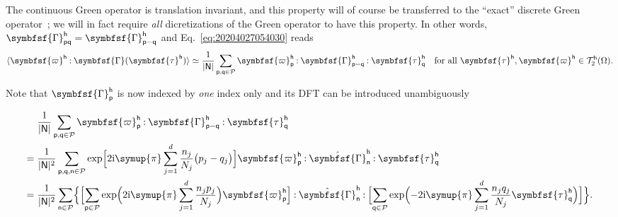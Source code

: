 \documentclass[draft, appendixprefix=true, chapterprefix=true, fontsize=12pt, numbers=noendperiod]{scrbook}
\newcommand{\cellindices}{\mathcal P}
\newcommand{\dbldot}{\mathbin{\mathord{:}}}
\newcommand{\I}{\mathrm{i}}
\newcommand{\tens}[1]{\symbfsf{#1}}
\newcommand{\PI}{\symup{\pi}}
\newcommand{\tensors}{\mathcal T}
\newcommand{\tuple}[1]{\mathsf{#1}}
\begin{document}
The continuous Green operator is translation invariant, and this property will
of course be transferred to the ``exact'' discrete Green operator~; we will in
fact require \emph{all} dicretizations of the Green operator to have this
property. In other words,
\(\tens\Gamma_{\tuple{p}\tuple{q}}^{\tuple{h}}=\tens\Gamma_{\tuple p-\tuple q}^{\tuple{h}}\)
and Eq.~\eqref{eq:20204027054030} reads
\begin{equation}
  \langle\tens\varpi^{\tuple{h}}\dbldot\tens\Gamma(\tens\tau^{\tuple{h}})\rangle
  \simeq\frac1{\lvert\tuple{N}\rvert}\sum_{\tuple{p}, \tuple{q}\in\cellindices}
  \tens\varpi_{\tuple{p}}^{\tuple{h}}\dbldot
  \tens\Gamma_{\tuple p-\tuple q}^{\tuple{h}}\dbldot\tens
  \tau_{\tuple{q}}^{\tuple{h}}\quad\text{for all }\tens\tau^{\tuple{h}},\tens
  \varpi^{\tuple{h}}\in\tensors_2^{\tuple{h}}(\Omega).
\end{equation}

Note that \(\tens\Gamma_{\tuple{p}}^{\tuple{h}}\) is now indexed by \emph{one}
index only and its DFT can be introduced unambiguously

\begin{equation}
  \label{eq:20201527081546}
  \begin{aligned}[b]
    &\frac{1}{\lvert\tuple N\rvert}\sum_{\tuple{p}, \tuple{q}\in\cellindices}
    \tens\varpi_{\tuple{p}}^{\tuple{h}}\dbldot\tens\Gamma_{\tuple p-\tuple q}^{\tuple h}
    \dbldot\tens\tau_{\tuple{q}}^{\tuple{h}}\\
    ={}&\frac1{\lvert\tuple N\rvert^2}\sum_{\tuple p, \tuple q, \tuple n\in\cellindices}
    \exp\Bigl[2\I\PI\sum_{j=1}^d\frac{n_j}{N_j}\bigl(p_j-q_j\bigr)\Bigr]
    \tens\varpi_{\tuple{p}}^{\tuple{h}}\dbldot\hat{\tens\Gamma}_{\tuple n}^{\tuple h}
    \dbldot\tens\tau_{\tuple q}^{\tuple h}\\
    ={}&\frac{1}{\lvert\tuple N\rvert^2}
    \sum_{\tuple n\in\cellindices}\Bigl\{\Bigl[\sum_{\tuple{p}\in\cellindices}
    \exp\Bigl(2\I\PI\sum_{j=1}^d\frac{n_jp_j}{N_j}\Bigr)
    \tens\varpi_{\tuple p}^{\tuple h}\Bigr]\dbldot\hat{\tens\Gamma}_{\tuple n}^{\tuple h}
    \dbldot\Bigl[\sum_{\tuple q\in\cellindices}\exp\Bigl(-2\I\PI\sum_{j=1}^d
    \frac{n_jq_j}{N_j}\tens\tau_{\tuple q}^{\tuple{h}}\Bigr)\Bigr]\Bigr\}.
  \end{aligned}
\end{equation}
\end{document}
